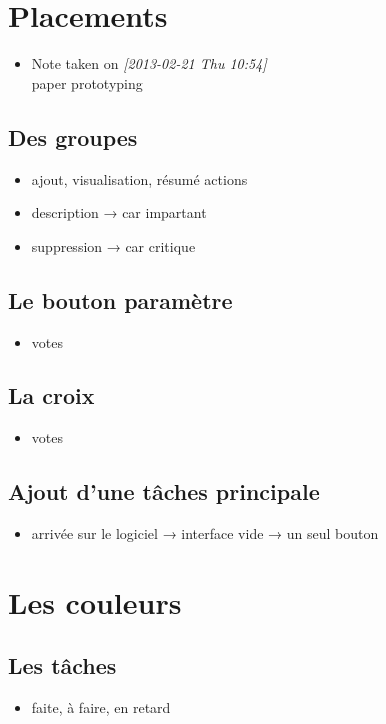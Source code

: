 \documentclass[11pt]{article}
\begin{document}
\section{Placements}
\begin{itemize}
\item Note taken on \textit{[2013-02-21 Thu 10:54]} \\
  paper prototyping
\end{itemize}


\subsection{Des groupes}
\begin{itemize}
\item ajout, visualisation, résumé actions
\item description → car impartant
\item suppression → car critique
\end{itemize}


\subsection{Le bouton paramètre}
\begin{itemize}
\item votes
\end{itemize}


\subsection{La croix}
\begin{itemize}
\item votes
\end{itemize}


\subsection{Ajout d'une tâches principale}
\begin{itemize}
\item arrivée sur le logiciel → interface vide → un seul bouton
\end{itemize}


\section{Les couleurs}


\subsection{Les tâches}
\begin{itemize}
\item faite, à faire, en retard
\end{itemize}
\end{document}
